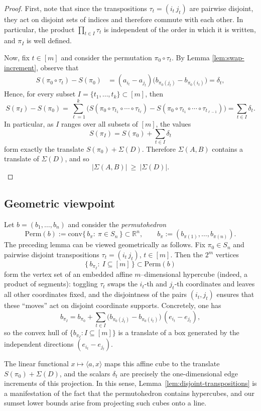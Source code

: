 \documentclass[12pt]{amsart}
\theoremstyle{definition}
\theoremstyle{remark}
\newcommand{\RR}{\mathbb{R}}
\newcommand{\abs}[1]{\left|#1\right|}
\newcommand{\Sig}{\Sigma}
\begin{document}
\begin{proof}
First, note that since the transpositions $\tau_t=(i_t\,j_t)$ are pairwise disjoint, they act on disjoint sets of indices and therefore commute with each other. In particular, the product $\prod_{t\in I}\tau_t$ is independent of the order in which it is written, and $\pi_I$ is well defined.

Now, fix $t\in[m]$ and consider the permutation $\pi_0\circ\tau_t$. By Lemma \ref{lem:swap-increment}, observe that
\begin{align*}
S(\pi_0\circ\tau_t)-S(\pi_0)
&=(a_{i_t}-a_{j_t})\bigl(b_{\pi_0(j_t)}-b_{\pi_0(i_t)}\bigr)
=\delta_t,
\end{align*}
Hence, for every subset $I=\{t_1,\dots,t_k\} \subset [m]$, then
\[
S(\pi_I)-S(\pi_0)
=\sum_{\ell=1}^k \bigl(S(\pi_0\circ\tau_{t_1}\circ\cdots\circ\tau_{t_\ell})
      -S(\pi_0\circ\tau_{t_1}\circ\cdots\circ\tau_{t_{\ell-1}})\bigr)=\sum_{t \in I} \delta_{t}.
\]
In particular, as $I$ ranges over all subsets of $[m]$, the values
\[
S(\pi_I)=S(\pi_0)+\sum_{t\in I}\delta_t
\]
form exactly the translate $S(\pi_0)+\Sig(D)$. Therefore $\Sig(A,B)$ contains a translate of
$\Sig(D)$, and so
\[
\abs{\Sig(A,B)}\ \ge\ \abs{\Sig(D)}.
\]
\end{proof}

\subsection*{Geometric viewpoint}
Let $b=(b_1,\dots,b_n)$ and consider the \emph{permutohedron}
\[
\mathrm{Perm}(b):=\mathrm{conv}\{\,b_\pi:\ \pi\in S_n\,\}\subset\RR^n,
\qquad
b_\pi:=(b_{\pi(1)},\dots,b_{\pi(n)}).
\]
The preceding lemma can be viewed geometrically as follows.  Fix $\pi_0\in S_n$ and pairwise disjoint
transpositions $\tau_t=(i_t\,j_t)$, $t\in[m]$.  Then the $2^m$ vertices
\[
\{\,b_{\pi_I}:\ I\subseteq[m]\,\}\subset \mathrm{Perm}(b)
\]
form the vertex set of an embedded affine $m$--dimensional hypercube (indeed, a product of segments):
toggling $\tau_t$ swaps the $i_t$-th and $j_t$-th coordinates and leaves all other coordinates fixed,
and the disjointness of the pairs $(i_t,j_t)$ ensures that these ``moves'' act on disjoint coordinate
supports.  Concretely, one has
\[
b_{\pi_I}
=
b_{\pi_0}+\sum_{t\in I}\bigl(b_{\pi_0(j_t)}-b_{\pi_0(i_t)}\bigr)\,(e_{i_t}-e_{j_t}),
\]
so the convex hull of $\{b_{\pi_I}:I\subseteq[m]\}$ is a translate of a box generated by the
independent directions $(e_{i_t}-e_{j_t})$.

The linear functional $x\mapsto \langle a,x\rangle$ maps this affine cube to the translate
$S(\pi_0)+\Sigma(D)$, and the scalars $\delta_t$ are precisely the one-dimensional edge increments
of this projection.  In this sense, Lemma~\ref{lem:disjoint-transpositions} is a manifestation of
the fact that the permutohedron contains hypercubes, and our sumset lower bounds arise from
projecting such cubes onto a line.
\end{document}

